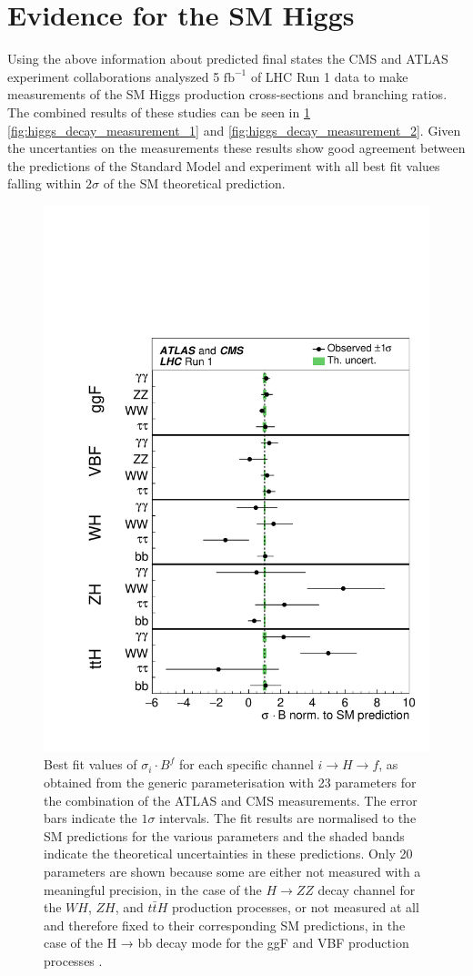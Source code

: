 \section{Evidence for the SM Higgs} \label{sec:higgs:higgs_evidence}

Using the above information about predicted final states the CMS and ATLAS
experiment collaborations analyszed 5 $\text{fb}^{-1}$ of LHC Run 1 data 
\cite{Khachatryan:2016vau} to make measurements of the SM Higgs production 
cross-sections and branching ratios.  The combined results of these studies 
can be seen in \cref{fig:higgs_production_measurement} 
\cref{fig:higgs_decay_measurement_1} and \cref{fig:higgs_decay_measurement_2}.  
Given the uncertanties on the measurements these results show good agreement 
between the predictions of the Standard Model and experiment with all best 
fit values falling within $2\sigma$ of the SM theoretical prediction.

\begin{figure}[!htbp]
  \begin{center}
    \includegraphics[width=0.5\linewidth]{figures/higgs/higgs_production_measurement.pdf}
    \caption{ Best fit values of $\sigma_{i} \cdot B^{f}$ for each specific channel $i \rightarrow H \rightarrow f$, as obtained from the generic parameterisation with 23 parameters for the combination of the ATLAS and CMS measurements. The error bars indicate the $1\sigma$ intervals. The fit results are normalised to the SM predictions for the various parameters and the shaded bands indicate the theoretical uncertainties in these predictions. Only 20 parameters are shown because some are either not measured with a meaningful precision, in the case of the $H \rightarrow ZZ$ decay channel for the $WH$, $ZH$, and $t\bar{t}H$ production processes, or not measured at all and therefore fixed to their corresponding SM predictions, in the case of the H → bb decay mode for the ggF and VBF production processes \cite{Khachatryan:2016vau}.}
    \label{fig:higgs_production_measurement}
  \end{center}
\end{figure}

